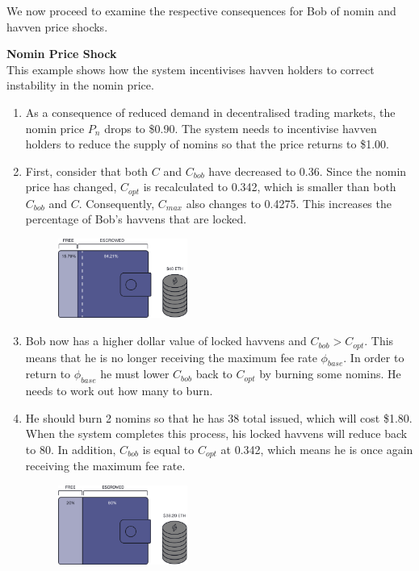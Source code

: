 \vspace{2mm}

\noindent We now proceed to examine the respective consequences for Bob of nomin and havven
price shocks.

\newpage
\noindent \textbf{Nomin Price Shock} \\

\noindent This example shows how the system incentivises havven holders
to correct instability in the nomin price.

\begin{enumerate}
    \item{As a consequence of reduced demand in decentralised trading markets,
          the nomin price $P_n$ drops to \$0.90. The system needs to incentivise havven
          holders to reduce the supply of nomins so that the price returns to \$1.00.
    }
    \item{First, consider that both $C$ and $C_{bob}$ have decreased to 0.36.
          Since the nomin price has changed, $C_{opt}$ is recalculated to 0.342, which
          is smaller than both $C_{bob}$ and $C$. Consequently, $C_{max}$ also changes
          to 0.4275. This increases the percentage of Bob's havvens that are locked.
    }

    \begin{figure}[h!]
        \centering
        \includegraphics[width=0.4\textwidth]{img/pn_drop}
    \end{figure}

    \item{Bob now has a higher dollar value of locked havvens and $C_{bob} >
          C_{opt}$. This means that he is no longer receiving the maximum fee rate
          $\phi_{base}$. In order to return to $\phi_{base}$ he must lower
          $C_{bob}$ back to $C_{opt}$ by burning some nomins. He needs to work out how
          many to burn.
    }

    \item{He should burn 2 nomins so that he has 38 total issued, which will cost
          \$1.80. When the system completes this process, his locked havvens will
          reduce back to 80. In addition, $C_{bob}$ is equal to $C_{opt}$ at 0.342,
          which means he is once again receiving the maximum fee rate.
    }
    \begin{figure}[h!]
    \centering
        \includegraphics[width=0.4\textwidth]{img/post_burn}
    \end{figure}


\end{enumerate}
